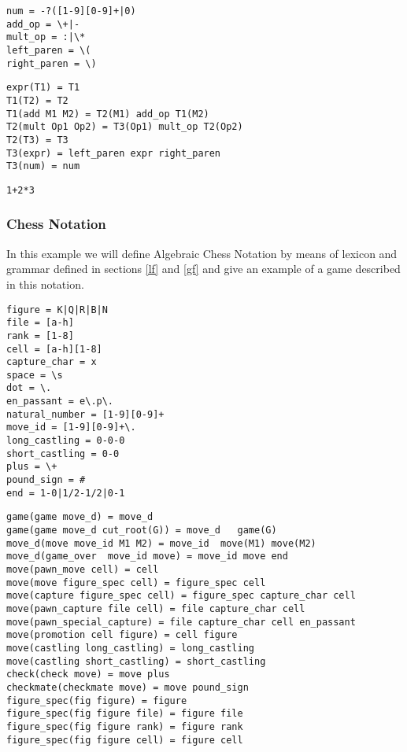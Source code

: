 \documentclass[a4paper,10pt]{article}
\newcounter{subsubsubsection}[subsubsection]
\begin{document}
\label{alex}
\begin{verbatim}
num = -?([1-9][0-9]+|0)
add_op = \+|-
mult_op = :|\*
left_paren = \(
right_paren = \)
\end{verbatim} 
\label{agram}

\begin{verbatim}
expr(T1) = T1
T1(T2) = T2
T1(add M1 M2) = T2(M1) add_op T1(M2)
T2(mult Op1 Op2) = T3(Op1) mult_op T2(Op2)
T2(T3) = T3
T3(expr) = left_paren expr right_paren
T3(num) = num   
\end{verbatim}
 
\label{asf}
\begin{verbatim}
1+2*3
\end{verbatim}
\subsubsection{Chess Notation}
In this example we will define Algebraic Chess Notation \cite{chess} by means of lexicon and grammar defined in sections \ref{lf} and \ref{gf} and give an example of a game described in this notation. 
\label{clex}
\begin{verbatim}
figure = K|Q|R|B|N
file = [a-h]
rank = [1-8]
cell = [a-h][1-8]
capture_char = x
space = \s
dot = \.
en_passant = e\.p\.
natural_number = [1-9][0-9]+
move_id = [1-9][0-9]+\.
long_castling = 0-0-0
short_castling = 0-0
plus = \+
pound_sign = #
end = 1-0|1/2-1/2|0-1
\end{verbatim}
\label{cgram}
\begin{verbatim}
game(game move_d) = move_d 
game(game move_d cut_root(G)) = move_d   game(G)
move_d(move move_id M1 M2) = move_id  move(M1) move(M2)
move_d(game_over  move_id move) = move_id move end
move(pawn_move cell) = cell
move(move figure_spec cell) = figure_spec cell
move(capture figure_spec cell) = figure_spec capture_char cell
move(pawn_capture file cell) = file capture_char cell
move(pawn_special_capture) = file capture_char cell en_passant
move(promotion cell figure) = cell figure
move(castling long_castling) = long_castling
move(castling short_castling) = short_castling
check(check move) = move plus
checkmate(checkmate move) = move pound_sign
figure_spec(fig figure) = figure
figure_spec(fig figure file) = figure file
figure_spec(fig figure rank) = figure rank
figure_spec(fig figure cell) = figure cell
\end{verbatim}
\end{document}

